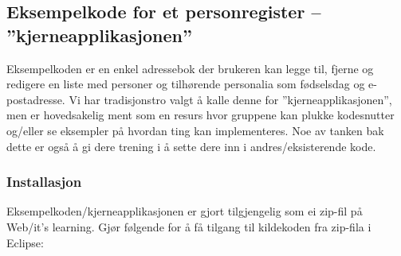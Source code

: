 \subsection{Eksempelkode for et personregister – ”kjerneapplikasjonen”}

Eksempelkoden er en enkel adressebok der brukeren kan legge til, fjerne og redigere en liste med personer og tilhørende personalia som fødselsdag og e-postadresse. Vi har tradisjonstro valgt å kalle denne for ”kjerneapplikasjonen”, men er hovedsakelig ment som en resurs hvor gruppene kan plukke kodesnutter og/eller se eksempler på hvordan ting kan implementeres. Noe av tanken bak dette er også å gi dere trening i å sette dere inn i andres/eksisterende kode.

\subsubsection{Installasjon}

Eksempelkoden/kjerneapplikasjonen er gjort tilgjengelig som ei zip-fil på Web/it’s learning. Gjør følgende for å få tilgang til kildekoden fra zip-fila i Eclipse:

